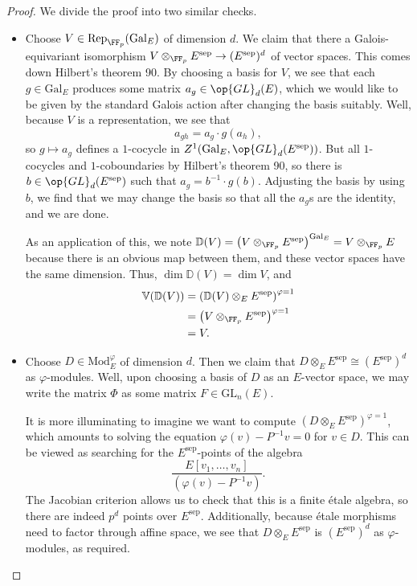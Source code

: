 \documentclass{article}
\begin{document}
\begin{proof}
	We divide the proof into two similar checks.
	\begin{itemize}
		\item Choose $V\in\mathrm{Rep}_{\FF_p}(\mathrm{Gal}_E)$ of dimension $d$. We claim that there a Galois-equivariant isomorphism $V\otimes_{\FF_p}E^{\mathrm{sep}}\to (E^{\mathrm{sep}})^d$ of vector spaces. This comes down Hilbert's theorem 90. By choosing a basis for $V$, we see that each $g\in\mathrm{Gal}_E$ produces some matrix $a_g\in\op{GL}_d(E)$, which we would like to be given by the standard Galois action after changing the basis suitably. Well, because $V$ is a representation, we see that
		\[a_{gh}=a_g\cdot g(a_h),\]
		so $g\mapsto a_g$ defines a $1$-cocycle in $Z^1(\mathrm{Gal}_E,\op{GL}_d(E^{\mathrm{sep}}))$. But all $1$-cocycles and $1$-coboundaries by Hilbert's theorem 90, so there is $b\in\op{GL}_d(E^{\mathrm{sep}})$ such that $a_g=b^{-1}\cdot g(b)$. Adjusting the basis by using $b$, we find that we may change the basis so that all the $a_g$s are the identity, and we are done.

		As an application of this, we note $\mathbb D(V)=\left(V\otimes_{\FF_p}E^{\mathrm{sep}}\right)^{\mathrm{Gal}_E}=V\otimes_{\FF_p}E$ because there is an obvious map between them, and these vector spaces have the same dimension. Thus, $\dim\mathbb D(V)=\dim V$, and
		\begin{align*}
			\mathbb V(\mathbb D(V)) &= \left(\mathbb D(V)\otimes_EE^{\mathrm{sep}}\right)^{\varphi=1} \\
			&= \left(V\otimes_{\FF_p}E^{\mathrm{sep}}\right)^{\varphi=1} \\
			&= V.
		\end{align*}

		\item Choose $D\in\mathrm{Mod}_E^\varphi$ of dimension $d$. Then we claim that $D\otimes_EE^{\mathrm{sep}}\cong(E^{\mathrm{sep}})^d$ as $\varphi$-modules. Well, upon choosing a basis of $D$ as an $E$-vector space, we may write the matrix $\Phi$ as some matrix $F\in\mathrm{GL}_n(E)$.

		It is more illuminating to imagine we want to compute $(D\otimes_EE^{\mathrm{sep}})^{\varphi=1}$, which amounts to solving the equation $\varphi(v)-P^{-1}v=0$ for $v\in D$. This can be viewed as searching for the $E^{\mathrm{sep}}$-points of the algebra
		\[\frac{E[v_1,\ldots,v_n]}{\left(\varphi(v)-P^{-1}v\right)}.\]
		The Jacobian criterion allows us to check that this is a finite \'etale algebra, so there are indeed $p^d$ points over $E^{\mathrm{sep}}$. Additionally, because \'etale morphisms need to factor through affine space, we see that $D\otimes_EE^{\mathrm{sep}}$ is $(E^{\mathrm{sep}})^d$ as $\varphi$-modules, as required.


\end{itemize}
\end{proof}
\end{document}
